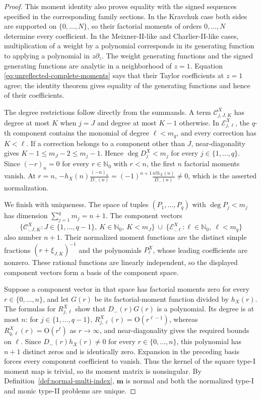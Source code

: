 \documentclass[10pt]{amsart}
\newcommand{\Nzero}{\mathbb N_0}
\newcommand{\mm}{\boldsymbol m}
\theoremstyle{plain}
\theoremstyle{definition}
\theoremstyle{remark}
\begin{document}
\begin{proof}
This moment identity also proves equality with the signed sequences
specified in the corresponding family sections.  In the Kravchuk case both sides are supported on
\(\{0,\ldots,N\}\), so their factorial moments of orders
\(0,\ldots,N\) determine every coefficient.  In the Meixner-II-like and
Charlier-II-like cases, multiplication of a weight by a polynomial
corresponds in its generating function to applying a polynomial in
\(z\partial_z\). The weight generating functions and the signed generating
functions are analytic in a neighborhood of \(z=1\).  Equation
\eqref{eq:unreflected-complete-moments} says that their Taylor
coefficients at \(z=1\) agree; the identity theorem gives equality of the
generating functions and hence of their coefficients.

The degree restrictions follow directly from the summands. A term
\(\mathcal C_{j,J,K}^X\) has degree at most \(K\) when \(j=J\) and degree
at most \(K-1\) otherwise. In \(\mathcal E_{j,\ell}^X\), the \(q\)-th component
contains the monomial of degree \(\ell<m_q\), and every correction has
\(K<\ell\). If a correction belongs to a component other than \(J\),
near-diagonality gives
\(K-1\le m_J-2\le m_j-1\).  Hence
\(\deg D_j^X<m_j\) for every \(j\in\{1,\ldots,q\}\). Since
\((-r)_n=0\) for every \(r\in\Nzero\) with \(r<n\), the first \(n\)
factorial moments
vanish. At \(r=n\),
\(-h_X(n)\frac{(-n)_n}{D_-(n)}
=(-1)^{n+1}\frac{n!h_X(n)}{D_-(n)}\ne0\), which is the asserted
normalization.

We finish with uniqueness. The space of tuples
\((P_1,\ldots,P_q)\) with \(\deg P_j<m_j\) has dimension
\(\sum_{j=1}^q m_j=n+1\). The component vectors
\[
 \{\mathcal C_{\cdot,J,K}^X:J\in\{1,\ldots,q-1\},\
 K\in\Nzero,\ K<m_J\}
 \ \cup\
 \{\mathcal E_{\cdot,\ell}^X:\ell\in\Nzero,\ \ell<m_q\}
\]
also number \(n+1\). Their normalized moment functions are the distinct simple
fractions \((r+\xi_{J,K})^{-1}\) and the polynomials
\(P_\ell^X\), whose leading coefficients are nonzero.  These rational
functions are linearly independent, so the displayed component vectors
form a basis of the component space.

Suppose a component vector in that space has factorial moments zero for
every \(r\in\{0,\ldots,n\}\), and let \(G(r)\) be its factorial-moment
function divided by \(h_X(r)\).
The formulas for \(R_{j,\ell}^X\) show that \(D_-(r)G(r)\) is a
polynomial. Its degree is at most \(n\): for
\(j\in\{1,\ldots,q-1\}\),
\(R_{j,\ell}^X(r)=\mathrm O(r^{\ell-1})\), whereas
\(R_{q,\ell}^X(r)=\mathrm O(r^\ell)\) as \(r\to\infty\), and
near-diagonality gives the required bounds on \(\ell\).  Since
\(D_-(r)h_X(r)\ne0\) for every \(r\in\{0,\ldots,n\}\), this polynomial has \(n+1\)
distinct zeros and is identically zero. Expansion in the preceding basis
forces every component coefficient to vanish. Thus the kernel of the
square type-I moment map is trivial, so its moment matrix is nonsingular.
By Definition~\ref{def:normal-multi-index}, \(\mm\) is normal and both the
normalized type-I and monic type-II problems are unique.
\end{proof}
\end{document}
